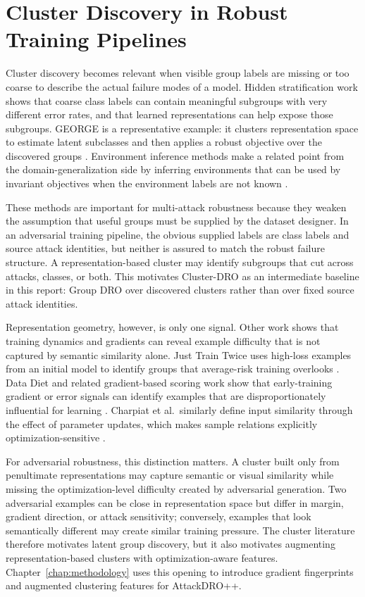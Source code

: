 \section{Cluster Discovery in Robust Training Pipelines}

Cluster discovery becomes relevant when visible group labels are missing or too
coarse to describe the actual failure modes of a model. Hidden stratification
work shows that coarse class labels can contain meaningful subgroups with very
different error rates, and that learned representations can help expose those
subgroups. GEORGE is a representative example: it clusters representation space
to estimate latent subclasses and then applies a robust objective over the
discovered groups \cite{sohoni2020no}. Environment inference methods make a
related point from the domain-generalization side by inferring environments
that can be used by invariant objectives when the environment labels are not
known \cite{creager2021environment}.

These methods are important for multi-attack robustness because they weaken the
assumption that useful groups must be supplied by the dataset designer. In an
adversarial training pipeline, the obvious supplied labels are class labels and
source attack identities, but neither is assured to match the robust failure
structure. A representation-based cluster may identify subgroups that cut
across attacks, classes, or both. This motivates Cluster-DRO as an intermediate
baseline in this report: Group DRO over discovered clusters rather than over
fixed source attack identities.

Representation geometry, however, is only one signal. Other work shows that
training dynamics and gradients can reveal example difficulty that is not
captured by semantic similarity alone. Just Train Twice uses high-loss examples
from an initial model to identify groups that average-risk training overlooks
\cite{liu2021just}. Data Diet and related gradient-based scoring work show that
early-training gradient or error signals can identify examples that are
disproportionately influential for learning \cite{paul2021deep}. Charpiat et
al.\ similarly define input similarity through the effect of parameter updates,
which makes sample relations explicitly optimization-sensitive
\cite{charpiat2019input}.

For adversarial robustness, this distinction matters. A cluster built only from
penultimate representations may capture semantic or visual similarity while
missing the optimization-level difficulty created by adversarial generation.
Two adversarial examples can be close in representation space but differ in
margin, gradient direction, or attack sensitivity; conversely, examples that
look semantically different may create similar training pressure. The cluster
literature therefore motivates latent group discovery, but it also motivates
augmenting representation-based clusters with optimization-aware features.
Chapter~\ref{chap:methodology} uses this opening to introduce gradient
fingerprints and augmented clustering features for AttackDRO++.
